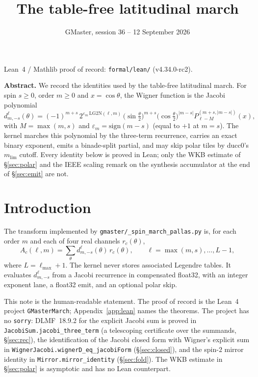 \documentclass[11pt,a4paper]{article}
\title{\textbf{The table-free latitudinal march}}
\author{}
\date{GMaster, session 36 -- 12 September 2026}
\newcommand{\LG}{\mathrm{LG2N}}
\newcommand{\mlim}{m_{\mathrm{lim}}}
\numberwithin{equation}{section}
\begin{document}
\maketitle
\vspace{-2.2em}

\begin{center}
{\small Lean~4 / Mathlib proof of record: \texttt{formal/lean/} (v4.34.0-rc2).}
\end{center}

\medskip
\noindent\textbf{Abstract.}
We record the identities used by the table-free latitudinal march.  For spin
$s\ge 0$, order $m\ge 0$ and $x=\cos\theta$, the Wigner function is the Jacobi
polynomial
\begin{equation*}
d^\ell_{m,-s}(\theta)
  =(-1)^{m+s}\,
   2^{\varepsilon_m\,\LG(\ell,m)}\,
   \bigl(\sin\tfrac{\theta}{2}\bigr)^{m+s}
   \bigl(\cos\tfrac{\theta}{2}\bigr)^{\lvert m-s\rvert}
   P_{\ell-M}^{(m+s,\lvert m-s\rvert)}(x),
\end{equation*}
with $M=\max(m,s)$ and $\varepsilon_m=\mathrm{sign}(m-s)$ (equal to $+1$ at
$m=s$).  The kernel marches this polynomial by the three-term recurrence,
carries an exact binary exponent, emits a binade-split partial, and may skip
polar tiles by ducc0's $\mlim$ cutoff.  Every identity below is proved in
Lean; only the WKB estimate of \S\ref{sec:polar} and the IEEE scaling remark
on the synthesis accumulator at the end of \S\ref{sec:emit} are not.

\tableofcontents

\section{Introduction}

The transform implemented by \texttt{gmaster/\_spin\_march\_pallas.py} is, for
each order $m$ and each of four real channels $r_c(\theta)$,
\begin{equation}
\label{eq:A}
A_c(\ell,m)
  =\sum_{\theta} d^\ell_{m,-s}(\theta)\, r_c(\theta),
  \qquad
  \ell=\max(m,s),\dots,L-1,
\end{equation}
where $L=\ell_{\max}+1$.  The kernel never stores associated Legendre tables.
It evaluates $d^\ell_{m,-s}$ from a Jacobi recurrence in compensated float32,
with an integer exponent lane, a float32 emit, and an optional polar skip.

This note is the human-readable statement.  The proof of record is the Lean~4
project \texttt{GMasterMarch}; Appendix~\ref{app:lean} names the theorems.
The project has no \texttt{sorry}: DLMF~18.9.2 for the explicit Jacobi sum
is proved in \texttt{JacobiSum.jacobi\_three\_term} (a telescoping certificate
over the summands, \S\ref{sec:rec}), the identification of the Jacobi closed
form with Wigner's explicit sum in \texttt{WignerJacobi.wignerD\_eq\_jacobiForm}
(\S\ref{sec:closed}), and the spin-$2$ mirror identity in
\texttt{Mirror.mirror\_identity} (\S\ref{sec:fold}).  The WKB estimate in
\S\ref{sec:polar} is asymptotic and has no Lean counterpart.
\end{document}
